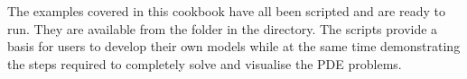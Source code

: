 The examples covered in this cookbook have all been scripted and are ready to run. They are available from the \exf folder in the \esc directory. The scripts provide a basis for users to develop their own models while at the same time demonstrating the steps required to completely solve and visualise the PDE problems.




